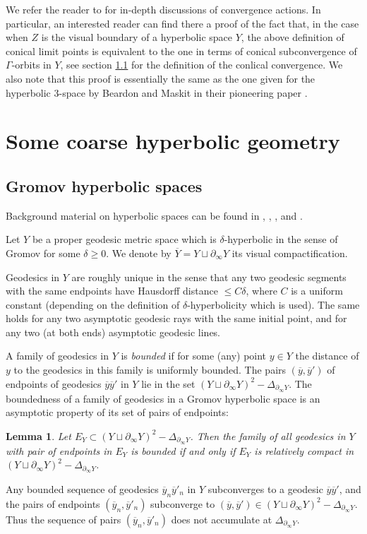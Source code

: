 \documentclass[12pt]{article}
\theoremstyle{boldplain}
\newtheorem{lem}[equation]{Lemma}
\theoremstyle{bolddefinition}
\numberwithin{equation}{section}
\def\Ga{\Gamma}
\def\de{\delta}
\def\De{\Delta}
\def\geo{\partial_{\infty}}
\def\ol{\overline}
\begin{document}
We refer the reader to \cite{Bowditch_config, Tukia1994, Tukia_conical}  for in-depth discussions of convergence actions. {In particular, an interested reader can find there a 
 proof of the fact that, in the case when $Z$ 
is the visual boundary of a hyperbolic space $Y$,  the above definition of conical limit points is equivalent to the one in terms of conical subconvergence of $\Ga$-orbits 
in $Y$, see section \ref{sec:HypSpaces} for the definition of the conlical convergence. 
We also note that this proof is essentially the same as the one given for the hyperbolic 3-space by Beardon and Maskit in their pioneering paper \cite[Theorem 1]{BM}.}




\section{Some coarse hyperbolic geometry}
\subsection{Gromov hyperbolic spaces}\label{sec:HypSpaces}

Background material on hyperbolic spaces
can be found in \cite{BH}, \cite{Bowditch2012}, \cite{Bourdon}, \cite{Drutu-Kapovich} and \cite{Vaisala}. 


Let $Y$ be a proper geodesic metric space which is $\de$-hyperbolic in the sense of Gromov 
for some $\de\geq0$.
We denote by $\ol Y=Y\sqcup\geo Y$ its visual compactification.  

Geodesics in $Y$ are roughly unique in the sense that
any two geodesic segments with the same endpoints have Hausdorff distance $\leq C\de$,
where $C$ is a uniform constant 
(depending on the definition of $\de$-hyperbolicity which is used).
The same holds for any two asymptotic geodesic rays with the same initial point,
and for any two (at both ends) asymptotic geodesic lines.

A family of geodesics in $Y$ is {\em bounded} if for some (any) point $y\in Y$ 
the distance of $y$ to the geodesics in this family is uniformly bounded.
The pairs $(\ol y,\ol y')$ of endpoints of geodesics $\ol y\ol y'$ in $Y$ lie in the set 
$(Y\sqcup\geo Y)^2 - \De_{\geo Y}$.
The boundedness of a family of geodesics in a Gromov hyperbolic space 
is an asymptotic property of its set of pairs of endpoints:
\begin{lem}
\label{lem:bddasyprp}
Let $E_Y\subset (Y\sqcup\geo Y)^2  - \De_{\geo Y}$.
Then the family of all geodesics in $Y$ with pair of endpoints in $E_Y$ is bounded
if and only if $E_Y$ is relatively compact in $(Y\sqcup\geo Y)^2 - \De_{\geo Y}$.
\end{lem}
\proof
Any bounded sequence of geodesics $\ol y_n\ol y'_n$ in $Y$ subconverges to a geodesic $\ol y\ol y'$,
and the pairs of endpoints $(\ol y_n,\ol y'_n)$ subconverge to $(\ol y,\ol y') \in (Y\sqcup\geo Y)^2 - \De_{\geo Y}$.
Thus the sequence of pairs $(\ol y_n,\ol y'_n)$ does not accumulate at $\De_{\geo Y}$.
\end{document}
